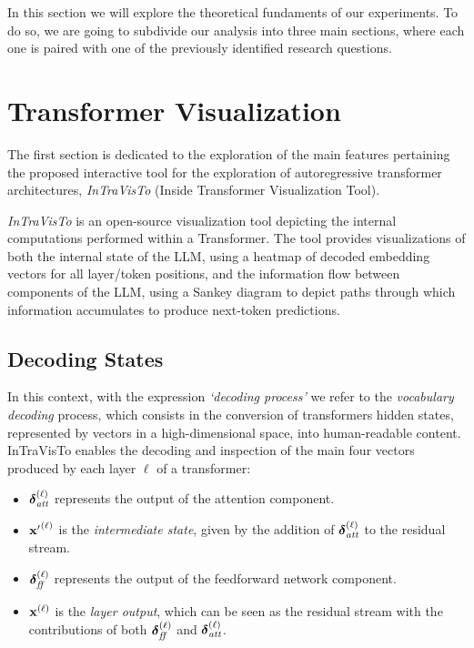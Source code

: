 In this section we will explore the theoretical fundaments of our experiments.
To do so, we are going to subdivide our analysis into three main sections, where each one is paired with one of the previously identified research questions.

\section{Transformer Visualization}

The first section is dedicated to the exploration of the main features pertaining the proposed interactive tool for the exploration of autoregressive transformer architectures, \emph{InTraVisTo} (Inside Transformer Visualization Tool).


    \emph{InTraVisTo} is an open-source visualization tool depicting the internal computations performed within a Transformer.
    The tool provides visualizations of both the internal state of the LLM, using a heatmap of decoded embedding vectors for all layer/token positions, and the information flow between components of the LLM, using a Sankey diagram to depict paths through which information accumulates to produce next-token predictions.

\subsection{Decoding States}

    In this context, with the expression \emph{`decoding process'} we refer to the \emph{vocabulary decoding} process, which consists in the conversion of transformers hidden states, represented by vectors in a high-dimensional space, into human-readable content.
    InTraVisTo enables the decoding and inspection of the main four vectors produced by each layer $\ell$ of a transformer:
    \begin{itemize}
        \item $\bm{\mathbf{\delta}}_\textit{att}^{(\ell)}$ represents the output of the attention component.
        \item ${\bm{\mathbf{x}}'}^{(\ell)}$ is the \emph{intermediate state}, given by the addition of $\bm{\mathbf{\delta}}_\textit{att}^{(\ell)}$ to the residual stream.
        \item $\bm{\mathbf{\delta}}_\textit{ff}^{(\ell)}$ represents the output of the feedforward network component.
        \item $\bm{\mathbf{x}}^{(\ell)}$ is the \emph{layer output}, which can be seen as the residual stream with the contributions of both $\bm{\mathbf{\delta}}_\textit{ff}^{(\ell)}$ and $\bm{\mathbf{\delta}}_\textit{att}^{(\ell)}$.
    \end{itemize}


